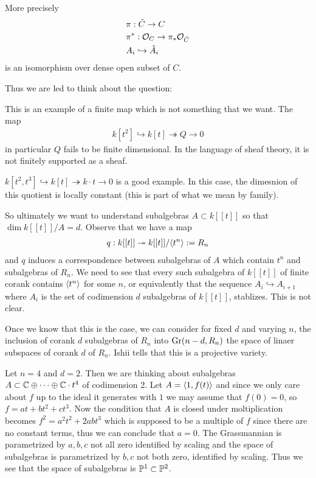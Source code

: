 \documentclass[12pt]{article}
\begin{document}
More precisely \begin{align*}
    &\pi:\tilde C\to C\\
    &\pi^*:\mc O_C\to \pi_*\mc O_{\tilde C} \\
    &A_i\hookrightarrow \tilde A_i
\end{align*} is an isomorphism over dense open subset of $C$.

Thus we are led to think about the question:


\begin{example}
    This is an example of a finite map which is not something that we want. The map \begin{align*}
        k[t^2]\hookrightarrow k[t]\twoheadrightarrow Q\to 0
    \end{align*} in particular $Q$ fails to be finite dimensional. In the language of sheaf theory, it is 
    not finitely supported as a sheaf.
\end{example}

\begin{example}
    $k[t^2,t^3]\hookrightarrow k[t]\twoheadrightarrow k\cdot t \to 0$ is a good example. In this case,
    the dimesnion of this quotient is locally constant (this is part of what we mean by family).
\end{example}

So ultimately we want to understand subalgebras $A\subset k[[t]]$ so that $\dim k[[t]]/A = d$. Observe that we have a map \begin{align*}
    q:k[[t]]\twoheadrightarrow k[[t]]/\ideal{t^n} := R_n
\end{align*} and $q$ induces a correspondence between subalgebras of $A$ which contain $t^n$ and subalgebras of $R_n$.
We need to see that every such subalgebra of $k[[t]]$ of finite corank contains $\ideal{t^n}$ for some $n$, or equivalently
that the sequence $A_i\hookrightarrow A_{i+1}$ where $A_i$ is the set of codimension $d$ subalgebras of $k[[t]]$, stablizes.
This is not clear.

Once we know that this is the case, we can consider for fixed $d$ and varying $n$, the inclusion of corank $d$ subalgebras of $R_n$
into $\Gr(n-d,R_n)$ the space of linaer subspaces of corank $d$ of $R_n$. Ishii tells that this is a projective variety.

\begin{example}
    Let $n = 4$ and $d = 2$. Then we are thinking about subalgebras $A\subset \C\oplus \dots \oplus \C\cdot t^4$ of codimension 2.
    Let $A = \ideal{1,f(t)}$ and since we only care about $f$ up to the ideal it generates with $1$ we may assume that $f(0) = 0$, so 
    $f = at + bt^2 + ct^3$. Now the condition that $A$ is closed under moltiplication becomes $f^2 = a^2t^2 + 2abt^3$ which is supposed 
    to be a multiple of $f$ since there are no constant terms, thus we can conclude that $a = 0$. The Grassmannian is parametrized by $a,b,c$ not all zero 
    identified by scaling and the space of subalgebras is parametrized by $b,c$ not both zero, identified by scaling. Thus we see that the
    space of subalgebras is $\P^1\subset \P^2$.
\end{example}
\end{document}
